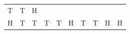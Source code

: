 {{\begin{center}
\begin{tabular}[t]{|l|l|l|l|l|l|l|l|l|l|}
        T &
        T &
        H%
     \tabularnewline\cline{1-1}\cline{2-2}\cline{3-3}\cline{4-4}\cline{5-5}\cline{6-6}\cline{7-7}\cline{8-8}\cline{9-9}\cline{10-10}
        H &
        T &
        T &
        T &
        T &
        H &
        T &
        T &
        H &
        H%

\end{tabular}
\end{center}}}
